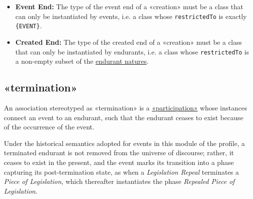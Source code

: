 \begin{itemize}
    \item \textbf{Event End:} The type of the event end of a «creation» must be a class that can only be instantiated by events, i.e. a class whose \texttt{restrictedTo} is exactly \texttt{\{EVENT\}}.
    \item \textbf{Created End:} The type of the created end of a «creation» must be a class that can only be instantiated by endurants, i.e. a class whose \texttt{restrictedTo} is a non-empty subset of the \hyperref[par:endurant-nature]{endurant natures}.
\end{itemize}




\subsection{«termination»}
\label{stereotype:termination}

An association stereotyped as «termination» is a \hyperref[stereotype:participation]{«participation»} whose instances connect an event to an endurant, such that the endurant ceases to exist because of the occurrence of the event.

Under the historical semantics adopted for events in this module of the profile, a terminated endurant is not removed from the universe of discourse; rather, it ceases to exist in the present, and the event marks its transition into a phase capturing its post-termination state, as when a \textit{Legislation Repeal} terminates a \textit{Piece of Legislation}, which thereafter instantiates the phase \textit{Repealed Piece of Legislation}.



